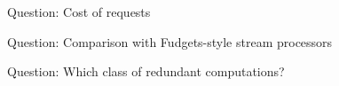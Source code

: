 \documentclass{beamer}
\begin{document}
\begin{frame}{Question: Cost of requests}

\end{frame}

\begin{frame}{Question: Comparison with Fudgets-style stream processors}

\end{frame}

\begin{frame}{Question: Which class of redundant computations?}

\end{frame}
\backupend
\end{document}
